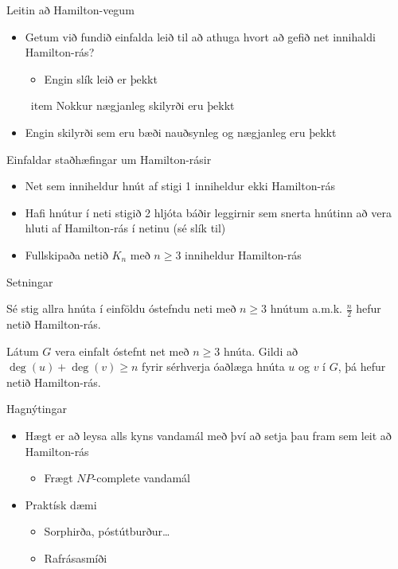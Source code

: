 \documentclass[handout]{beamer}
\begin{document}
\begin{frame}{Leitin að Hamilton-vegum}
\begin{itemize}
 \item Getum við fundið einfalda leið til að athuga hvort að gefið net innihaldi Hamilton-rás? \pause
 \begin{itemize}
  \item Engin slík leið er þekkt
 \end{itemize}
\ item Nokkur nægjanleg skilyrði eru þekkt
 \item Engin skilyrði sem eru bæði nauðsynleg og nægjanleg eru þekkt
\end{itemize}
\end{frame}

\begin{frame}{Einfaldar staðhæfingar um Hamilton-rásir}
\begin{itemize}[<+->]
 \item Net sem inniheldur hnút af stigi 1 inniheldur ekki Hamilton-rás
 \item Hafi hnútur í neti stigið 2 hljóta báðir leggirnir sem snerta hnútinn að vera hluti af Hamilton-rás í netinu (sé slík til)
 \item Fullskipaða netið $K_n$ með $n \geq 3$ inniheldur Hamilton-rás
\end{itemize}
\end{frame}

\begin{frame}{Setningar}
\begin{tcolorbox}[title=Setning Diracs]
Sé stig allra hnúta í einföldu óstefndu neti með $n \geq 3$ hnútum a.m.k. $\frac{n}{2}$ hefur netið Hamilton-rás.
\end{tcolorbox}
\begin{tcolorbox}[title=Setning Ores]
Látum $G$ vera einfalt óstefnt net með $n \geq 3$ hnúta. Gildi að $\deg(u) + \deg(v) \geq n$ fyrir sérhverja óaðlæga hnúta $u$ og $v$ í $G$, þá hefur netið Hamilton-rás.
\end{tcolorbox}
\end{frame}

\begin{frame}{Hagnýtingar}
\begin{itemize}
 \item Hægt er að leysa alls kyns vandamál með því að setja þau fram sem leit að Hamilton-rás
 \begin{itemize}
  \item Frægt $NP$-complete vandamál
 \end{itemize}
 \item Praktísk dæmi
 \begin{itemize}
  \item Sorphirða, póstútburður\ldots
  \item Rafrásasmíði
 \end{itemize}
\end{itemize}
\end{frame}
\end{document}
